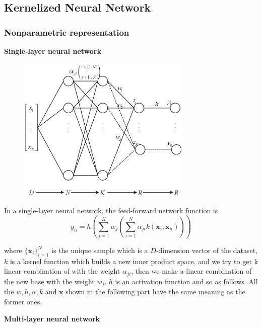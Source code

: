 \documentclass{article}
\begin{document}
\subsection{Kernelized Neural Network}


\subsubsection{Nonparametric representation}


\par \textbf{Single-layer neural network}\\

\begin{figure}[h]
\centering
\includegraphics[height=7cm]{Non-para_single-layer}
\end{figure}

\par In a single-layer neural network, the feed-forward network function is 
\begin{equation}
y_n = h \left( \sum\limits_{j=1}^{K} w_{j} \left( \sum\limits_{i=1}^{N} \alpha_{ji} k( \mathbf{x}_{i} , \mathbf{x}_{n}) \right)\right)
\end{equation} 

where $ \{ \mathbf{x}_{i}\}_{i=1}^{N}$ is the unique sample which is a $D$-dimension vector of the dataset, $k$ is a kernel function which builds a new inner product space, and we try to get k linear combination of with the weight $\alpha_{ji}$, then we make a linear combination of the new base with the weight $ w_{j}$. $h$ is an activation function and so as follows.  
All the $w, h, \alpha, k$ and $\mathbf{x}$ shown in the following part have the same meaning as the former ones.\\



\par \textbf{Multi-layer neural network} \\
\end{document}
